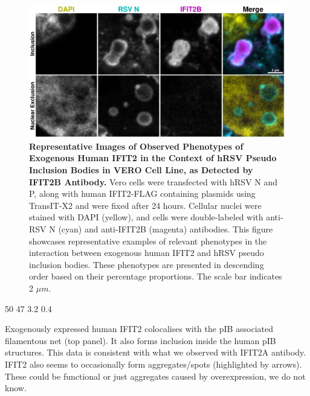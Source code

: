 \begin{figure}
    \centering
    \includegraphics[width=1\linewidth]{08. Chapter 3/Figs/03. pIB/03. IFIT2/04. IFIT2-FLAG/02. IFIT2B/03. i2b-hi2f-hnhp.pdf}
    \caption[Representative Images of Observed Phenotypes of Exogenous Human IFIT2 in the Context of hRSV Pseudo Inclusion Bodies in VERO Cell Line, as Detected by IFIT2B Antibody.]{\textbf{Representative Images of Observed Phenotypes of Exogenous Human IFIT2 in the Context of hRSV Pseudo Inclusion Bodies in VERO Cell Line, as Detected by IFIT2B Antibody.} Vero cells were transfected with hRSV N and P, along with human IFIT2-FLAG containing plasmids using TransIT-X2 and were fixed after 24 hours. Cellular nuclei were stained with DAPI (yellow), and cells were double-labeled with anti-RSV N (cyan) and anti-IFIT2B (magenta) antibodies. This figure showcases representative examples of relevant phenotypes in the interaction between exogenous human IFIT2 and hRSV pseudo inclusion bodies. These phenotypes are presented in descending order based on their percentage proportions. The scale bar indicates 2 \(\mu m\).}
    \label{fig:Representative Images of Observed Phenotypes of Exogenous Human IFIT2 in the Context of hRSV Pseudo Inclusion Bodies in VERO Cell Line, as Detected by IFIT2B Antibody}
\end{figure}

50 47
3.2 0.4

Exogenously expressed human IFIT2 colocalises with the pIB associated filamentous net (top panel). It also forms inclusion inside the human pIB structures. This data is consistent with what we observed with IFIT2A antibody. IFIT2 also seems to occasionally form aggregates/spots (highlighted by arrows). These could be functional or just aggregates caused by overexpression, we do not know.

